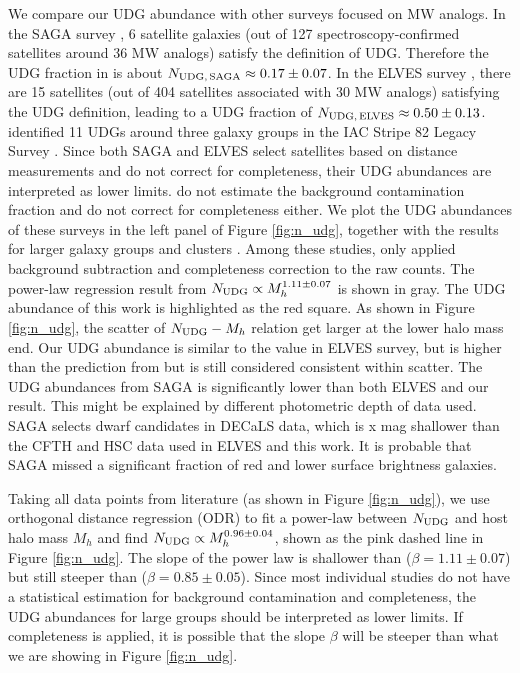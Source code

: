 \documentclass[twocolumn,astrosymb,twocolappendix]{aastex631}
\begin{document}
\begin{CJK*}{UTF8}{gbsn}
We compare our UDG abundance with other surveys focused on MW analogs. In the SAGA survey \citep{SAGA-II}, 6 satellite galaxies (out of 127 spectroscopy-confirmed satellites around 36 MW analogs) satisfy the definition of UDG. Therefore the UDG fraction in \citet{SAGA-II} is about $N_{\rm UDG,\, SAGA} \approx 0.17\pm0.07$. In the ELVES survey \citep{CarlstenELVES2022}, there are 15 satellites (out of 404 satellites associated with 30 MW analogs) satisfying the UDG definition, leading to a UDG fraction of $N_{\rm UDG,\, ELVES} \approx 0.50\pm0.13$. \citet{Roman2017b} identified 11 UDGs around three galaxy groups in the IAC Stripe 82 Legacy Survey \citep{Fliri2016}. Since both SAGA and ELVES select satellites based on distance measurements and do not correct for completeness, their UDG abundances are interpreted as lower limits. \citet{Roman2017b} do not estimate the background contamination fraction and do not correct for completeness either. We plot the UDG abundances of these surveys in the left panel of Figure \ref{fig:n_udg}, together with the results for larger galaxy groups and clusters \citep{Koda2015,Munoz2015,Roman2017a,Roman2017b,Janssens2017,vdBurg2017}. Among these studies, only \citet{vdBurg2017} applied background subtraction and completeness correction to the raw counts. The power-law regression result from \citet{vdBurg2017} $N_{\rm UDG} \propto M_h^{1.11\pm 0.07}$ is shown in gray. The UDG abundance of this work is highlighted as the red square. As shown in Figure \ref{fig:n_udg}, the scatter of $N_{\rm UDG}-M_h$ relation get larger at the lower halo mass end. Our UDG abundance is similar to the value in ELVES survey, but is higher than the prediction from \citet{vdBurg2017} but is still considered consistent within scatter. The UDG abundances from SAGA is significantly lower than both ELVES and our result. This might be explained by different photometric depth of data used. SAGA selects dwarf candidates in DECaLS data, which is x mag shallower than the CFTH and HSC data used in ELVES and this work. It is probable that SAGA missed a significant fraction of red and lower surface brightness galaxies. 

Taking all data points from literature (as shown in Figure \ref{fig:n_udg}), we use orthogonal distance regression (ODR) to fit a power-law between $N_{\rm UDG}$ and host halo mass $M_h$ and find $N_{\rm UDG} \propto M_h^{0.96\pm 0.04}$, shown as the pink dashed line in Figure \ref{fig:n_udg}. The slope of the power law is shallower than \citet{vdBurg2017} ($\beta=1.11\pm0.07$) but still steeper than \citet{Roman2017b} ($\beta=0.85\pm0.05$). Since most individual studies do not have a statistical estimation for background contamination and completeness, the UDG abundances for large groups should be interpreted as lower limits. If completeness is applied, it is possible that the slope $\beta$ will be steeper than what we are showing in Figure \ref{fig:n_udg}.


\end{CJK*}
\end{document}
